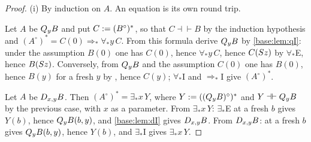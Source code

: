 \begin{proof}
(i) By induction on $A$.  An equation is its own round trip.

Let $A$ be $Q_{y}B$ and put $C\mathrel{:=}(B^\circ)^{*}$, so that
$C\dashv\vdash B$ by the induction hypothesis and
$(A^\circ)^{*}=C(0)\Rightarrow_*\forall_* y\,C$.  From this formula derive
$Q_{y}B$ by \cref{base:lem:qI}: under the assumption $B(0)$ one has $C(0)$,
hence $\forall_* y\,C$, hence $C(S z)$ by $\forall_*$E, hence
$B(S z)$.  Conversely, from $Q_{y}B$ and the assumption $C(0)$ one has
$B(0)$, hence $B(y)$ for a fresh $y$ by , hence $C(y)$;
$\forall_*$I and $\Rightarrow_*$I give $(A^\circ)^{*}$.

Let $A$ be $D_{x,y}B$.  Then $(A^\circ)^{*}=\exists_* x\,Y$, where
$Y\mathrel{:=}((Q_{y}B)^\circ)^{*}$ and $Y\dashv\vdash Q_{y}B$ by the previous
case, with $x$ as a parameter.  From $\exists_* x\,Y$: $\exists_*$E at a
fresh $b$ gives $Y(b)$, hence $Q_{y}B(b,y)$, and \cref{base:lem:dI} gives
$D_{x,y}B$.  From $D_{x,y}B$:  at a fresh $b$ gives
$Q_{y}B(b,y)$, hence $Y(b)$, and $\exists_*$I gives $\exists_* x\,Y$.


\end{proof}
